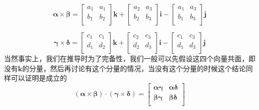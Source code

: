 \documentclass{article}
\newcommand{\ve}{\boldsymbol}
\begin{document}
\begin{CJK}{UTF8}{gkai}
\[\ve{\alpha}\times \ve{\beta}=
\begin{bmatrix}
    a_1&a_1\\
    b_1&b_2\\
\end{bmatrix}\ve{k}
+
\begin{bmatrix}
    a_2&a_3\\
    b_2&b_3\\
\end{bmatrix}\ve{i}
-\begin{bmatrix}
    a_1&a_3\\
    b_1&b_3\\
\end{bmatrix}\ve{j}\]

\[\ve{\gamma}\times \ve{\delta}=
\begin{bmatrix}
    c_1&c_1\\
    d_1&d_2\\
\end{bmatrix}\ve{k}
+
\begin{bmatrix}
    c_2&c_3\\
    d_2&d_3\\
\end{bmatrix}\ve{i}
-\begin{bmatrix}
    c_1&c_3\\
    d_1&d_3\\
\end{bmatrix}\ve{j}\]
当然事实上，我们在推导时为了完备性，我们一般可以先假设这四个向量共面，即没有$\ve{k}$的分量，然后再讨论有这个分量的情况，当没有这个分量的时候这个结论同样可以证明是成立的\\

\[(\ve{\alpha}\times\ve{\beta})\cdot(\ve{\gamma}\times\ve{\delta})=
\begin{bmatrix}
    \ve{\alpha}\ve{\gamma}&\ve{\alpha}\ve{\delta}\\
    \ve{\beta}\ve{\gamma}&\ve{\beta}\ve{\delta}\\
\end{bmatrix}\]


\end{CJK}
\end{document}
